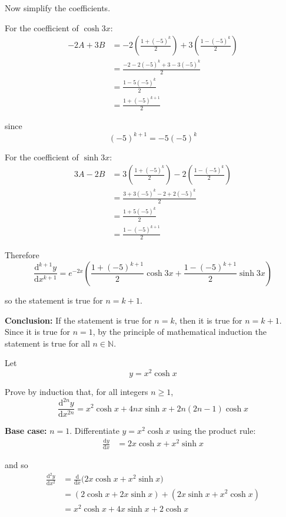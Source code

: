 \documentclass[leqno]{article}
\begin{document}
\begin{enumerate}[
  label=\textbf{\arabic*.},
  leftmargin=*,
  topsep=0pt,
  partopsep=0pt,
  parsep=0pt
]
\begin{djsSolution}
Now simplify the coefficients.

For the coefficient of \(\cosh 3x\):
\begin{align*}
-2A+3B
&=-2\left(\frac{1+(-5)^k}{2}\right)+3\left(\frac{1-(-5)^k}{2}\right) \\
&=\frac{-2-2(-5)^k+3-3(-5)^k}{2} \\
&=\frac{1-5(-5)^k}{2} \\
&=\frac{1+(-5)^{k+1}}{2}
\end{align*}

since
\[
(-5)^{k+1}=-5(-5)^k
\]

For the coefficient of \(\sinh 3x\):
\begin{align*}
3A-2B
&=3\left(\frac{1+(-5)^k}{2}\right)-2\left(\frac{1-(-5)^k}{2}\right) \\
&=\frac{3+3(-5)^k-2+2(-5)^k}{2} \\
&=\frac{1+5(-5)^k}{2} \\
&=\frac{1-(-5)^{k+1}}{2}
\end{align*}

Therefore
\[
\frac{\mathrm{d}^{k+1}y}{\mathrm{d}x^{k+1}}
=
e^{-2x}\left(\frac{1+(-5)^{k+1}}{2}\cosh 3x+\frac{1-(-5)^{k+1}}{2}\sinh 3x\right)
\]

so the statement is true for \(n=k+1\).

\textbf{Conclusion:} If the statement is true for \(n=k\), then it is true for \(n=k+1\). Since it is true for \(n=1\), by the principle of mathematical induction the statement is true for all \(n\in\mathbb{N}\).
\end{djsSolution}


\newpage

\questionitem

Let \[y = x^2\cosh x\]

Prove by induction that, for all integers $n \ge 1$,
\[
\frac{\mathrm{d}^{2n}y}{\mathrm{d}x^{2n}} = x^2\cosh x + 4nx\sinh x + 2n(2n-1)\cosh x
\] 

\vspace*{10pt}

\begin{djsSolution}
\textbf{Base case:} \(n=1\). Differentiate \(y=x^2\cosh x\) using the product rule:
\begin{align*}
\frac{\mathrm{d}y}{\mathrm{d}x}
&=2x\cosh x+x^2\sinh x
\end{align*}

and so
\begin{align*}
\frac{\mathrm{d}^2y}{\mathrm{d}x^2}
&=\frac{\mathrm{d}}{\mathrm{d}x}\bigl(2x\cosh x+x^2\sinh x\bigr)\\
&=(2\cosh x+2x\sinh x)+(2x\sinh x+x^2\cosh x)\\
&=x^2\cosh x+4x\sinh x+2\cosh x
\end{align*}


\end{djsSolution}
\end{enumerate}
\end{document}
